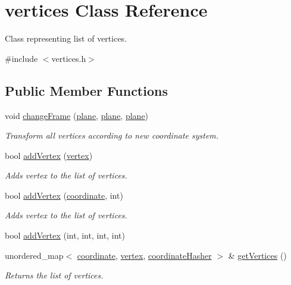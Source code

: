 \hypertarget{classvertices}{}\section{vertices Class Reference}
\label{classvertices}


Class representing list of vertices.  




{\ttfamily \#include $<$vertices.\+h$>$}

\subsection*{Public Member Functions}
\begin{DoxyCompactItemize}
\item 
void \mbox{\hyperlink{classvertices_a842f219dca716e76d5c3a8f9db3146f1}{change\+Frame}} (\mbox{\hyperlink{structplane}{plane}}, \mbox{\hyperlink{structplane}{plane}}, \mbox{\hyperlink{structplane}{plane}})
\begin{DoxyCompactList}\small\item\em Transform all vertices according to new coordinate system. \end{DoxyCompactList}\item 
bool \mbox{\hyperlink{classvertices_aef99918efeee8f6381db0c31d5af32b0}{add\+Vertex}} (\mbox{\hyperlink{objects_8h_a220193f61d87fe6929bf42d2bac515a7}{vertex}})
\begin{DoxyCompactList}\small\item\em Adds vertex to the list of vertices. \end{DoxyCompactList}\item 
bool \mbox{\hyperlink{classvertices_a69b3a5c8963e6772fd0c36d0189665e8}{add\+Vertex}} (\mbox{\hyperlink{structcoordinate}{coordinate}}, int)
\begin{DoxyCompactList}\small\item\em Adds vertex to the list of vertices. \end{DoxyCompactList}\item 
bool \mbox{\hyperlink{classvertices_aab2aad643ab383c4192c8e51b8ed3041}{add\+Vertex}} (int, int, int, int)
\item 
unordered\+\_\+map$<$ \mbox{\hyperlink{structcoordinate}{coordinate}}, \mbox{\hyperlink{objects_8h_a220193f61d87fe6929bf42d2bac515a7}{vertex}}, \mbox{\hyperlink{structcoordinate_hasher}{coordinate\+Hasher}} $>$ \& \mbox{\hyperlink{classvertices_aee841be820213961900a8a7855b8b692}{get\+Vertices}} ()
\begin{DoxyCompactList}\small\item\em Returns the list of vertices. \end{DoxyCompactList}\end{DoxyCompactItemize}
